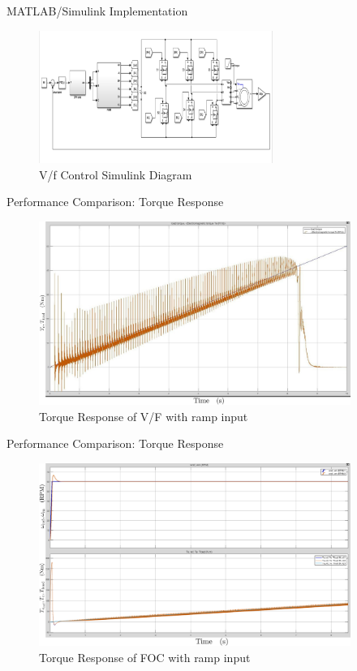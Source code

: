 \begin{frame}{MATLAB/Simulink Implementation}
	\begin{figure}
		\includegraphics[width=3in]{conference/vfSimulation.png} %
		\caption{V/f Control Simulink Diagram}
	\end{figure}
\end{frame}


\begin{frame}{Performance Comparison: Torque Response}
	\begin{figure}
		\includegraphics[width=4in]{conference/60rpmTorque.jpeg} %
		\caption{Torque Response of V/F with ramp input}
	\end{figure}
\end{frame}

\begin{frame}{Performance Comparison: Torque Response}
	\begin{figure}
		\includegraphics[width=4in]{conference/foc_60rpm.png} %
		\caption{Torque Response of FOC with ramp input}
	\end{figure}
\end{frame}


